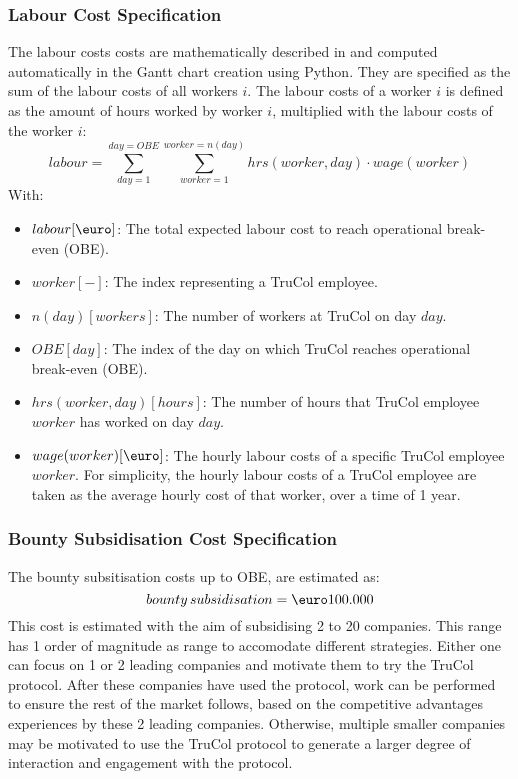 \subsubsection{Labour Cost Specification}\label{subsubsec:labour_cost_specification}
The labour costs costs are mathematically described in  and computed automatically in the Gantt chart creation using Python. They are specified as the sum of the labour costs of all workers $i$. The labour costs of a worker $i$ is defined as the amount of hours worked by worker $i$, multiplied with the labour costs of the worker $i$:
\begin{equation}
	labour=\sum_{day=1}^{day=OBE} \sum_{worker=1} ^{worker=n(day)} hrs(worker,day)\cdot wage(worker)
	\label{eq:labour_costs}
\end{equation}
With:
\begin{itemize}
	\item $labour [\text{\euro}]$: The total expected labour cost to reach operational break-even (OBE).
	\item $worker [-]$: The index representing a TruCol employee.
	\item $n(day) [workers]$: The number of workers at TruCol on day $day$.
	\item $OBE [day]$: The index of the day on which TruCol reaches operational break-even  (OBE).
	\item $hrs(worker,day) [hours]$: The number of hours that TruCol employee $worker$ has worked on day $day$.
	\item $wage(worker) [\text{\euro}]$: The hourly labour costs of a specific TruCol employee $worker$. For simplicity, the hourly labour costs of a TruCol employee are taken as the average hourly cost of that worker, over a time of 1 year.
\end{itemize}

\subsubsection{Bounty Subsidisation Cost Specification}\label{subsubsec:bounty_subsidisation_cost_specification}
The bounty subsitisation costs up to OBE, are estimated as:
\begin{equation}
	{bounty\, subsidisation}=\text{\euro}100.000
	\label{eq:bounty_subsidisation}
\end{equation}
This cost is estimated with the aim of subsidising 2 to 20 companies. This range has 1 order of magnitude as range to accomodate different strategies. Either one can focus on 1 or 2 leading companies and motivate them to try the TruCol protocol. After these companies have used the protocol, work can be performed to ensure the rest of the market follows, based on the competitive advantages experiences by these 2 leading companies. Otherwise, multiple smaller companies may be motivated to use the TruCol protocol to generate a larger degree of interaction and engagement with the protocol.

